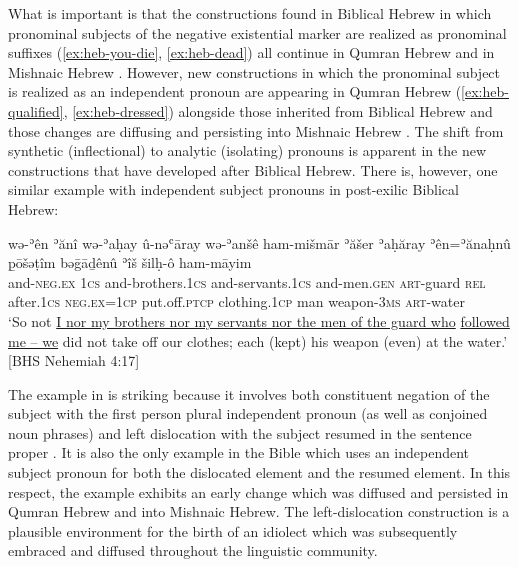 ﻿\documentclass[output=paper]{langsci/langscibook}
\begin{document}
What is important is that the constructions found in Biblical Hebrew in
which pronominal subjects of the negative existential marker are realized
as pronominal suffixes (\ref{ex:heb-you-die}, \ref{ex:heb-dead}) all continue in Qumran Hebrew
 and in Mishnaic Hebrew . However, new
constructions in which the pronominal subject is realized as an independent
pronoun are appearing in Qumran Hebrew
(\ref{ex:heb-qualified}, \ref{ex:heb-dressed}) alongside those
inherited from Biblical Hebrew and those changes are diffusing and
persisting into Mishnaic Hebrew . The shift from synthetic
(inflectional) to analytic (isolating) pronouns is apparent in the new
constructions that have developed after Biblical Hebrew. There is, however,
one similar example with independent subject pronouns in post-exilic
Biblical Hebrew:
%
\begin{exe}\ex \label{ex:heb-weapon}
    \gll wə-ʾên ʾănî wə-ʾaḥay û-nəʿāray     wə-ʾanšê ham-mišmār ʾăšer
    ʾaḥăray    ʾên=ʾănaḥnû p̱ōšəṭîm bə\={g}āḏênû  ʾîš šilḥ-ô ham-māyim
    \\
  and-\textsc{neg.ex} \textsc{1cs} and-brothers.\textsc{1cs}
  and-servants.\textsc{1cs} and-men.\textsc{gen}  \textsc{art}-guard
  \textsc{rel}  after.\textsc{1cs}   \textsc{neg.ex}=\textsc{1cp}
  put.off.\textsc{ptcp}  clothing.\textsc{1cp}   man    
  weapon-\textsc{3ms}   \textsc{art}-water \\
    \glt `So not \underline{I nor my brothers nor my servants nor the men of the guard
    who} \underline{followed me – we} did not take off our clothes; each (kept) his
    weapon (even) at the water.' [BHS Nehemiah 4:17]
    \end{exe}%
%
The example in  is striking because it involves both
constituent negation of the subject with the first person plural
independent pronoun (as well as conjoined noun phrases) and left
dislocation with the subject resumed in the sentence proper 
\parencite[see][]{MillerNaude2015}. It is also the only example in the Bible
which uses an independent subject pronoun for both the dislocated element
and the resumed element. In this respect, the example exhibits an early
change which was diffused and persisted in Qumran Hebrew and into Mishnaic
Hebrew. The left-dislocation construction is a plausible environment for
the birth of an idiolect which was subsequently embraced and diffused
throughout the linguistic community. 
\end{document}
